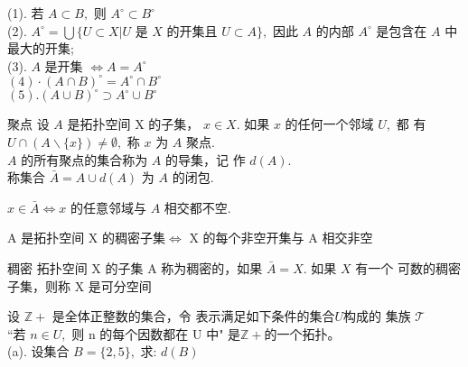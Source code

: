 \begin{property}
(1). 若 $A \subset B,$ 则 $A^{\circ} \subset B^{\circ}$ \\
(2). $A^{\circ}=\bigcup\{U \subset X | U \text { 是 } X \text { 的开集且 } U \subset A\},$ 因此 $A$ 的内部 $A^{\circ}$ 是包含在
$A$ 中最大的开集;\\
(3). $A$ 是开集 $\Longleftrightarrow A=A^{\circ}$\\
$(4) \cdot(A \cap B)^{\circ}=A^{\circ} \cap B^{\circ}$ \\
$(5) .(A \cup B)^{\circ} \supset A^{\circ} \cup B^{\circ}$ \\
\end{property}
\begin{definition}{聚点}
\noindent 设 $A$ 是拓扑空间 X 的子集， $x \in X .$ 如果 $x$ 的任何一个邻域 $U,$ 都
有 $U \cap(A \backslash\{x\}) \neq \emptyset,$ 称 $x$ 为 $A$ 聚点. \\$A$ 的所有聚点的集合称为 $A$ 的导集，记
作 $d(A) .$  \\称集合 $\bar{A}=A \cup d(A)$ 为 $A$ 的闭包.
\end{definition}
\begin{theorem}
\noindent $x \in \bar{A} \Longleftrightarrow x$ 的任意邻域与 $A$ 相交都不空.
\end{theorem}
\begin{theorem}
\noindent A 是拓扑空间 X 的稠密子集$\Longleftrightarrow$ X 的每个非空开集与 A 相交非空
\end{theorem}
\begin{definition}{稠密}
\noindent 拓扑空间 X 的子集 A 称为稠密的，如果 $\bar{A}=X .$ 如果 $X$ 有一个
可数的稠密子集，则称 X 是可分空间
\end{definition}
\begin{exercise}
设 $\mathbb{Z}+$ 是全体正整数的集合，令 表示满足如下条件的集合$U$构成的
集族 $\mathcal{T}$\\
“若 $n \in U,$ 则 $\mathrm{n}$ 的每个因数都在 $\mathrm{U}$ 中"
是$\mathbb{Z}+$的一个拓扑。\\
(a). 设集合 $B=\{2,5\},$ 求: $d(B)$

\end{exercise}